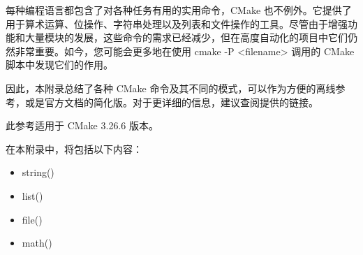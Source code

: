 
每种编程语言都包含了对各种任务有用的实用命令，CMake 也不例外。它提供了用于算术运算、位操作、字符串处理以及列表和文件操作的工具。尽管由于增强功能和大量模块的发展，这些命令的需求已经减少，但在高度自动化的项目中它们仍然非常重要。如今，您可能会更多地在使用 cmake -P <filename> 调用的 CMake 脚本中发现它们的作用。

因此，本附录总结了各种 CMake 命令及其不同的模式，可以作为方便的离线参考，或是官方文档的简化版。对于更详细的信息，建议查阅提供的链接。

此参考适用于 CMake 3.26.6 版本。

在本附录中，将包括以下内容：

\begin{itemize}
\item
string()

\item
list()

\item
file()

\item
math()
\end{itemize}




















